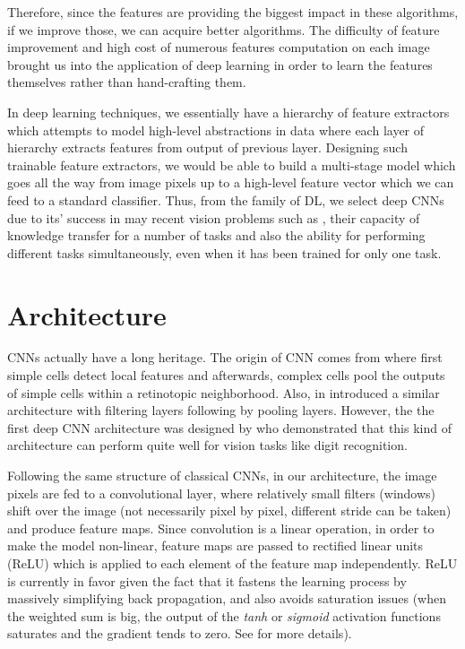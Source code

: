 \indent Therefore, since the features are providing the biggest impact in these algorithms, if we improve those, we can acquire better algorithms. The difficulty of feature improvement and high cost of numerous features computation on each image brought us into the application of deep learning in order to learn the features themselves rather than hand-crafting them. 

In deep learning techniques, we essentially have a hierarchy of feature extractors which attempts to model high-level abstractions in data\cite{deng2014deep, bengio2009learning, bengio2013representation, arel2010deep, schmidhuber2015deep} where each layer of hierarchy extracts features from output of previous layer. Designing such trainable feature extractors, we would be able to build a multi-stage model which goes all the way from image pixels up to a high-level feature vector which we can feed to a standard classifier. Thus, from the family of DL, we select deep CNNs due to its' success in may recent vision problems such as \cite{cirecsan2011convolutional, ciresan2015multi, wan2013regularization, cirecsan2012multi}, their capacity of knowledge transfer for a number of tasks and also the ability for performing different tasks simultaneously, even when it has been trained for only one task\cite{zhou2014learning}. 

\section{Architecture}

CNNs actually have a long heritage. The origin of CNN comes from \cite{hubel1962receptive} where first simple cells detect local features and afterwards, complex cells pool the outputs of simple cells within a retinotopic neighborhood. Also, \citeauthor*{fukushima1975cognitron} in \cite{fukushima1975cognitron, fukushima1980neocognitron} introduced a similar architecture with filtering layers following by pooling layers. However, the the first deep CNN architecture was designed by \citealt{lecun1989backpropagation} who demonstrated that this kind of architecture can perform quite well for vision tasks like digit recognition.

Following the same structure of classical CNNs, in our architecture, the image pixels are fed to a convolutional layer, where relatively small filters (windows) shift over the image (not necessarily pixel by pixel, different stride can be taken) and produce feature maps. Since convolution is a linear operation, in order to make the model non-linear, feature maps are passed to rectified linear units (ReLU) \cite{nair2010rectified} which is applied to each element of the feature map independently. ReLU is currently in favor given the fact that it fastens the learning process by massively simplifying back propagation, and also avoids saturation issues (when the weighted sum is big, the output of the \textit{tanh} or \textit{sigmoid} activation functions saturates and the gradient tends to zero. See \cite{hansen1990neural, amit1987statistical} for more details). 

